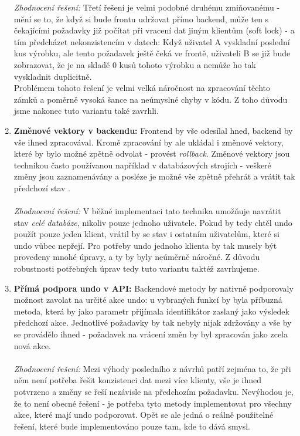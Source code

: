 \begin{enumerate}
	\emph{Zhodnocení řešení:} Třetí řešení je velmi podobné druhému zmiňovanému - mění se to, že když si bude frontu udržovat přímo backend, může ten s čekajícími požadavky již počítat při vracení dat jiným klientům (soft lock) - a tím předcházet nekonzistencím v datech: Když uživatel A vyskladní poslední kus výrobku, ale tento požadavek ještě čeká ve frontě, uživateli B se již bude zobrazovat, že je na skladě 0 kusů tohoto výrobku a nemůže ho tak vyskladnit duplicitně.\\
	Problémem tohoto řešení je velmi velká náročnost na zpracování těchto zámků a poměrně vysoká šance na neúmyslné chyby v kódu. Z toho důvodu jsme nakonec tuto variantu také zavrhli.
	\item \textbf{Změnové vektory v backendu:} Frontend by vše odesílal hned, backend by vše ihned zpracovával. Kromě zpracování by ale ukládal i změnové vektory, které by bylo možné zpětně odvolat - provést \emph{rollback}. Změnové vektory jsou technikou často používanou například v databázových strojích - veškeré změny jsou zaznamenávány a posléze je možné vše zpětně přehrát a vrátit tak předchozí stav \cite{valenta-db}.\\\\
	\emph{Zhodnocení řešení:} V běžné implementaci tato technika umožňuje navrátit stav \emph{celé databáze}, nikoliv pouze jednoho uživatele. Pokud by tedy chtěl undo použít pouze jeden klient, vrátil by se stav i ostatním uživatelům, které si undo vůbec nepřejí. Pro potřeby undo jednoho klienta by tak musely být provedeny mnohé úpravy, a ty by byly neúměrně náročné. Z důvodu robustnosti potřebných úprav tedy tuto variantu taktéž zavrhujeme.
	\item \textbf{Přímá podpora undo v API:} Backendové metody by nativně podporovaly možnost zavolat na určité akce undo: u vybraných funkcí by byla příbuzná metoda, která by jako parametr přijímala identifikátor zaslaný jako výsledek předchozí akce. Jednotlivé požadavky by tak nebyly nijak zdržovány a vše by se provádělo ihned - požadavek na vrácení změn by byl zpracován jako zcela nová akce.\\\\
	\emph{Zhodnocení řešení:} Mezi výhody posledního z návrhů patří zejména to, že při něm není potřeba řešit konzistenci dat mezi více klienty, vše je ihned potvrzeno a změny se řeší nezávisle na předchozím požadavku. Nevýhodou je, že to není obecné řešení - je potřeba tyto metody implementovat pro všechny akce, které mají undo podporovat. Opět se ale jedná o reálně použitelné řešení, které bude implementováno pouze tam, kde to dává smysl.
\end{enumerate}

